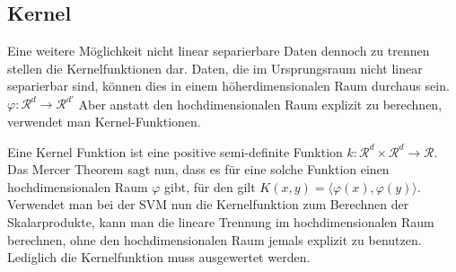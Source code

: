 \documentclass{scrartcl}
\begin{document}
\subsection{Kernel}
Eine weitere Möglichkeit nicht linear separierbare Daten dennoch zu trennen stellen die Kernelfunktionen dar.
Daten, die im Ursprungsraum nicht linear separierbar sind, können dies in einem höherdimensionalen Raum durchaus sein. $\varphi : \mathcal R^d \rightarrow \mathcal R^{d'}$
Aber anstatt den hochdimensionalen Raum explizit zu berechnen, verwendet man Kernel-Funktionen.
 
Eine Kernel Funktion ist eine positive semi-definite Funktion $k: \mathcal R^d \times \mathcal R^d \rightarrow \mathcal R$.
Das Mercer Theorem sagt nun, dass es für eine solche Funktion einen hochdimensionalen Raum $\varphi$ gibt, für den gilt $K(x,y) = \langle \varphi(x), \varphi(y) \rangle$.
Verwendet man bei der SVM nun die Kernelfunktion zum Berechnen der Skalarprodukte, kann man die lineare Trennung im hochdimensionalen Raum berechnen, ohne den hochdimensionalen Raum jemals explizit zu benutzen.  Lediglich die Kernelfunktion muss ausgewertet werden.
\end{document}
